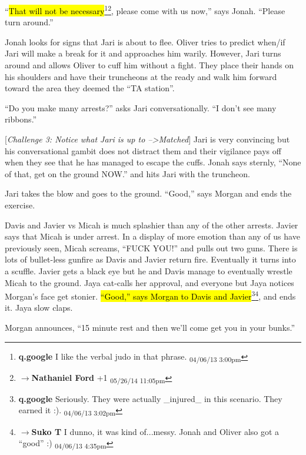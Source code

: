 ``\hl{That will not be necessary}\footnote{\textbf{q.google }I like the verbal judo in that phrase. \textsubscript{04/06/13 3:00pm}}\footnote{$\rightarrow$\textbf{Nathaniel Ford }+1 \textsubscript{05/26/14 11:05pm}}, please come with us now,'' says Jonah.  ``Please turn around.''

Jonah looks for signs that Jari is about to flee.  Oliver tries to predict when/if Jari will make a break for it and approaches him warily.   However, Jari turns around and allows Oliver to cuff him without a fight.  They place their hands on his shoulders and have their truncheons at the ready and walk him forward toward the area they deemed the ``TA station''.  



``Do you make many arrests?'' asks Jari conversationally.  ``I don't see many ribbons.''

{[}\textit{Challenge 3: Notice what Jari is up to --\textgreater  Matched}{]}  Jari is very convincing but his conversational gambit does not distract them and their vigilance pays off when they see that he has managed to escape the cuffs.  Jonah says sternly, ``None of that, get on the ground NOW.'' and hits Jari with the truncheon.



Jari takes the blow and goes to the ground.  ``Good,'' says Morgan and ends the exercise.



Davis and Javier vs Micah is much splashier than any of the other arrests.  Javier says that Micah is under arrest. In a display of more emotion than any of us have previously seen, Micah screams, ``FUCK YOU!'' and pulls out two guns.  There is lots of bullet-less gunfire as Davis and Javier return fire.  Eventually it turns into a scuffle.  Javier gets a black eye but he and Davis manage to eventually wrestle Micah to the ground.  Jaya cat-calls her approval, and everyone but Jaya notices Morgan's face get stonier.  \hl{``Good,'' says Morgan to Davis and Javier}\footnote{\textbf{q.google }Seriously.  They were actually \_injured\_ in this scenario.  They earned it
:). \textsubscript{04/06/13 3:02pm}}\footnote{$\rightarrow$\textbf{Suko T }I dunno, it was kind of...messy.  Jonah and Oliver also got a ``good'' :) \textsubscript{04/06/13 4:35pm}}, and ends it.  Jaya slow claps.



Morgan announces, ``15 minute rest and then we'll come get you in your bunks.''



